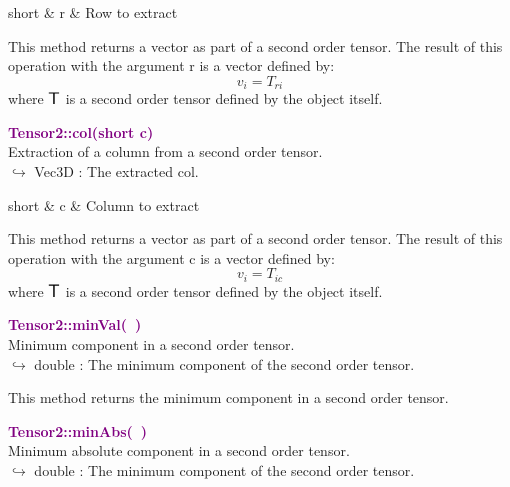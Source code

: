\begin{tcolorbox}[width=\textwidth,myArgs,tabularx={ll|R}]
short & r & Row to extract
\end{tcolorbox}

This method returns a vector as part of a second order tensor.
The result of this operation with the argument r is a vector defined by:
\begin{equation*}
v_{i} = T_{ri}
\end{equation*}
where $\mbox{\large\ensuremath{\mathsf{T}}}$ is a second order tensor defined by the object itself.

\textcolor{purple}{\textbf{Tensor2::col(short c)}}\label{Tensor2::col(short c)}\\
Extraction of a column from a second order tensor.\\ \hspace*{10mm}$\hookrightarrow$ Vec3D : The extracted col.

\begin{tcolorbox}[width=\textwidth,myArgs,tabularx={ll|R}]
short & c & Column to extract
\end{tcolorbox}

This method returns a vector as part of a second order tensor.
The result of this operation with the argument c is a vector defined by:
\begin{equation*}
v_{i} = T_{ic}
\end{equation*}
where $\mbox{\large\ensuremath{\mathsf{T}}}$ is a second order tensor defined by the object itself.

\textcolor{purple}{\textbf{Tensor2::minVal(~)}}\label{Tensor2::minVal()}\\
Minimum component in a second order tensor.\\ \hspace*{10mm}$\hookrightarrow$ double : The minimum component of the second order tensor.

This method returns the minimum component in a second order tensor.

\textcolor{purple}{\textbf{Tensor2::minAbs(~)}}\label{Tensor2::minAbs()}\\
Minimum absolute component in a second order tensor.\\ \hspace*{10mm}$\hookrightarrow$ double : The minimum component of the second order tensor.

